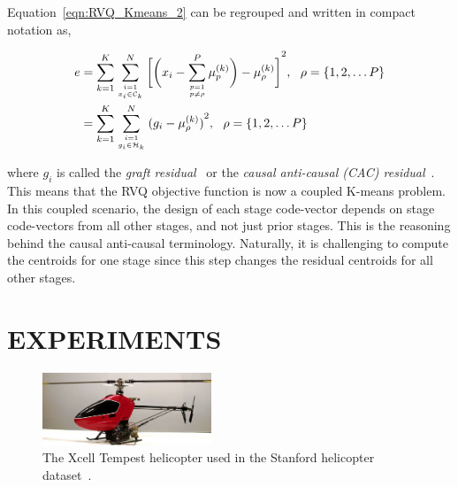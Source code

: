 \documentclass{article}
\begin{document}
Equation~\ref{eqn:RVQ_Kmeans_2} can be regrouped and written in compact notation as,

\begin{align}
e&= \KmeansSum{\bigg[\RVQmultipleKmeansonealternate\bigg]}^2, \ \ \rho=\{1, 2, \ldots P\}\notag\\
&={\RVQerroralternate}, \ \ \rho=\{1, 2, \ldots P\}
\label{eqn:RVQ_Kmeans_3}
\end{align}

where $g_i$ is called the \emph{graft residual}~\cite{1993_JNL_RVQDSC_Barnes} or the \emph{causal anti-causal (CAC) residual}~\cite{1993_JNL_RVQDSC_Barnes}.  This means that the RVQ objective function is now a coupled K-means problem.  In this coupled scenario, the design of each stage code-vector depends on stage code-vectors from all other stages, and not just prior stages.  This is the reasoning behind the causal anti-causal terminology.    Naturally, it is challenging to compute the centroids for one stage since this step changes the residual centroids for all other stages.  


\section{EXPERIMENTS}

\begin{figure}[t]
\centering	
\includegraphics[width=0.45\textwidth]{figs/papers_ICAI2013_heli.png}
\caption{The Xcell Tempest helicopter used in the Stanford helicopter dataset~\cite{dataset_StanfordHelicopter}.} 
\label{fig:heli}				
\end{figure}
\end{document}
